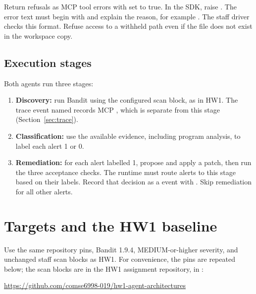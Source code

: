 \documentclass[9pt,letterpaper]{article}
\begin{document}
Return refusals as MCP tool errors with  set to true. In the SDK,
raise . The error text must begin with  and explain
the reason, for example .
The staff driver checks this format. Refuse access to a withheld path even if the
file does not exist in the workspace copy.

\subsection{Execution stages}\label{sec:stages}

Both agents run three stages:
\begin{enumerate}
\item \textbf{Discovery:} run Bandit using the configured scan block, as in HW1.
  The trace event named  records MCP , which is
  separate from this stage (Section~\ref{sec:trace}).
\item \textbf{Classification:} use the available evidence, including program
  analysis, to label each alert 1 or 0.
\item \textbf{Remediation:} for each alert labelled 1, propose and apply a patch,
  then run the three acceptance checks. The runtime must route alerts to this
  stage based on their labels. Record that decision as a  event
  with . Skip remediation for all other alerts.
\end{enumerate}

\section{Targets and the HW1 baseline}\label{sec:targets}

Use the same repository pins, Bandit 1.9.4, MEDIUM-or-higher severity, and
unchanged staff scan blocks as HW1. For convenience, the pins are repeated below;
the scan blocks are in the HW1 assignment repository, in :
\par\noindent\url{https://github.com/comse6998-019/hw1-agent-architectures}\par
\end{document}
